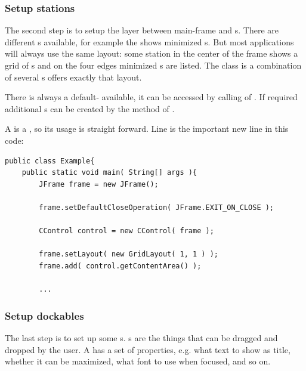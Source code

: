 
\subsubsection{Setup stations}
The second step is to setup the layer between main-frame and s. There are different s available, for example the  shows minimized s. But most applications will always use the same layout: some station in the center of the frame shows a grid of s and on the four edges minimized s are listed. The class  is a combination of several s offers exactly that layout.

There is always a default- available, it can be accessed by calling  of . If required additional s can be created by the method  of .

A  is a , so its usage is straight forward. Line  is the important new line in this code:
\begin{lstlisting}
public class Example{
	public static void main( String[] args ){
		JFrame frame = new JFrame();
		
		frame.setDefaultCloseOperation( JFrame.EXIT_ON_CLOSE );
		
		CControl control = new CControl( frame );
		
		frame.setLayout( new GridLayout( 1, 1 ) );
		frame.add( control.getContentArea() );
		
		...
\end{lstlisting}


\subsubsection{Setup dockables}
The last step is to set up some s. s are the things that can be dragged and dropped by the user. A  has a set of properties, e.g. what text to show as title, whether it can be maximized, what font to use when focused, and so on.

